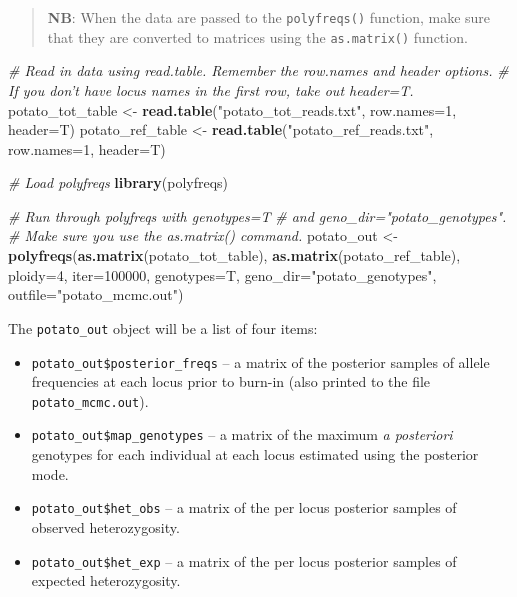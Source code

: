 \documentclass[]{article}
\newenvironment{Shaded}{\begin{snugshade}}{\end{snugshade}}
\newcommand{\KeywordTok}[1]{\textcolor[rgb]{0.13,0.29,0.53}{\textbf{{#1}}}}
\newcommand{\DataTypeTok}[1]{\textcolor[rgb]{0.13,0.29,0.53}{{#1}}}
\newcommand{\DecValTok}[1]{\textcolor[rgb]{0.00,0.00,0.81}{{#1}}}
\newcommand{\StringTok}[1]{\textcolor[rgb]{0.31,0.60,0.02}{{#1}}}
\newcommand{\CommentTok}[1]{\textcolor[rgb]{0.56,0.35,0.01}{\textit{{#1}}}}
\newcommand{\NormalTok}[1]{{#1}}
\begin{document}
\begin{quote}
\textbf{NB}: When the data are passed to the \texttt{polyfreqs()}
function, make sure that they are converted to matrices using the
\texttt{as.matrix()} function.
\end{quote}

\begin{Shaded}
\begin{Highlighting}[]
\CommentTok{# Read in data using read.table. Remember the row.names and header options.}
\CommentTok{# If you don't have locus names in the first row, take out header=T.}
\NormalTok{potato_tot_table <-}\StringTok{ }\KeywordTok{read.table}\NormalTok{(}\StringTok{"potato_tot_reads.txt"}\NormalTok{, }\DataTypeTok{row.names=}\DecValTok{1}\NormalTok{, }\DataTypeTok{header=}\NormalTok{T)}
\NormalTok{potato_ref_table <-}\StringTok{ }\KeywordTok{read.table}\NormalTok{(}\StringTok{"potato_ref_reads.txt"}\NormalTok{, }\DataTypeTok{row.names=}\DecValTok{1}\NormalTok{, }\DataTypeTok{header=}\NormalTok{T)}

\CommentTok{# Load polyfreqs}
\KeywordTok{library}\NormalTok{(polyfreqs)}

\CommentTok{# Run through polyfreqs with genotypes=T}
\CommentTok{# and geno_dir="potato_genotypes".}
\CommentTok{# Make sure you use the as.matrix() command.}
\NormalTok{potato_out <-}\StringTok{ }\KeywordTok{polyfreqs}\NormalTok{(}\KeywordTok{as.matrix}\NormalTok{(potato_tot_table), }
                        \KeywordTok{as.matrix}\NormalTok{(potato_ref_table), }\DataTypeTok{ploidy=}\DecValTok{4}\NormalTok{, }\DataTypeTok{iter=}\DecValTok{100000}\NormalTok{, }
                        \DataTypeTok{genotypes=}\NormalTok{T, }\DataTypeTok{geno_dir=}\StringTok{"potato_genotypes"}\NormalTok{, }
                        \DataTypeTok{outfile=}\StringTok{"potato_mcmc.out"}\NormalTok{)}
\end{Highlighting}
\end{Shaded}

The \texttt{potato\_out} object will be a list of four items:

\begin{itemize}
\item
  \texttt{potato\_out\$posterior\_freqs} -- a matrix of the posterior
  samples of allele frequencies at each locus prior to burn-in (also
  printed to the file \texttt{potato\_mcmc.out}).
\item
  \texttt{potato\_out\$map\_genotypes} -- a matrix of the maximum
  \emph{a posteriori} genotypes for each individual at each locus
  estimated using the posterior mode.
\item
  \texttt{potato\_out\$het\_obs} -- a matrix of the per locus posterior
  samples of observed heterozygosity.
\item
  \texttt{potato\_out\$het\_exp} -- a matrix of the per locus posterior
  samples of expected heterozygosity.
\end{itemize}
\end{document}
